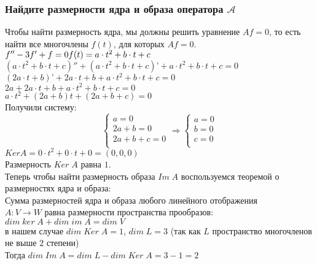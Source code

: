 \documentclass{article}
\begin{document}
    \subsubsection{Найдите размерности ядра и образа оператора $\mathcal{A}$}
    Чтобы найти размерность ядра, мы должны решить уравнение $Af=0$,
    то есть найти все многочлены $f(t)$, для которых $Af=0$.\\
    $f'' - 3f' + f = 0 \\
    f(t) = a  \cdot  t^2 + b \cdot  t + c$\\
    $(a  \cdot  t^2 + b \cdot  t + c)'' + (a  \cdot  t^2 + b \cdot  t + c)’ + a  \cdot  t^2 + b \cdot  t + c = 0$\\
    $(2a  \cdot  t + b)’ + 2a  \cdot  t + b + a  \cdot  t^2 + b \cdot  t + c = 0$\\
    $2a + 2a  \cdot  t + b + a  \cdot  t^2 + b \cdot  t + c = 0$\\
    $a  \cdot  t^2 + (2a + b) t + (2a + b + c) = 0$\\
    Получили систему:\\
    \begin{equation*}
            \begin{cases}
                a = 0 \\
                2a + b = 0 \\
                2a + b + c = 0 \\
            \end{cases}
            \Rightarrow
            \begin{cases}
                a = 0 \\
                b = 0 \\
                c = 0 \\
            \end{cases}
        \end{equation*}
    $Ker A = {0 \cdot  t^2 + 0 \cdot  t + 0} = {(0, 0, 0)}$\\
    Размерность $Ker \; A$ равна $1$.\\
    Теперь чтобы найти размерность образа $Im \; A$ воспользуемся теоремой
    о размерностях ядра и образа: \\
    Сумма размерностей ядра и образа любого линейного отображения\\
    $A: V \to W$ равна размерности пространства прообразов: \\
    $dim \; ker \; A + dim \; im \; A = dim \; V$ \\
    в нашем случае $dim \; Ker \; A = 1$, $dim \; L = 3$ (так как $L$ пространство
    многочленов не выше $2$ степени)\\
    Тогда $dim \; Im \; A = dim \; L - dim \; Ker \; A = 3 - 1 = 2$
    
\end{document}
